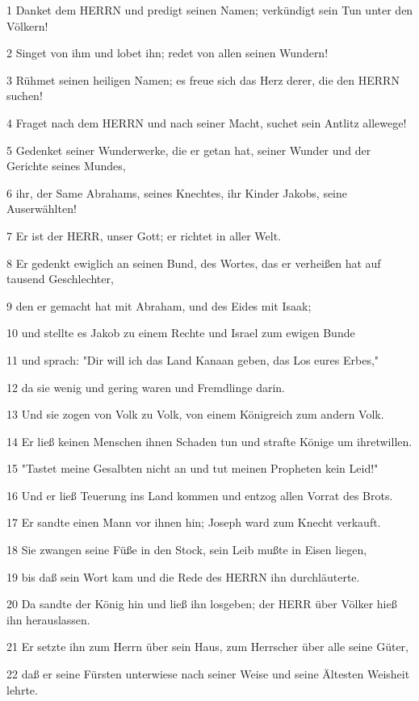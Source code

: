 \par 1 Danket dem HERRN und predigt seinen Namen; verkündigt sein Tun unter den Völkern!
\par 2 Singet von ihm und lobet ihn; redet von allen seinen Wundern!
\par 3 Rühmet seinen heiligen Namen; es freue sich das Herz derer, die den HERRN suchen!
\par 4 Fraget nach dem HERRN und nach seiner Macht, suchet sein Antlitz allewege!
\par 5 Gedenket seiner Wunderwerke, die er getan hat, seiner Wunder und der Gerichte seines Mundes,
\par 6 ihr, der Same Abrahams, seines Knechtes, ihr Kinder Jakobs, seine Auserwählten!
\par 7 Er ist der HERR, unser Gott; er richtet in aller Welt.
\par 8 Er gedenkt ewiglich an seinen Bund, des Wortes, das er verheißen hat auf tausend Geschlechter,
\par 9 den er gemacht hat mit Abraham, und des Eides mit Isaak;
\par 10 und stellte es Jakob zu einem Rechte und Israel zum ewigen Bunde
\par 11 und sprach: "Dir will ich das Land Kanaan geben, das Los eures Erbes,"
\par 12 da sie wenig und gering waren und Fremdlinge darin.
\par 13 Und sie zogen von Volk zu Volk, von einem Königreich zum andern Volk.
\par 14 Er ließ keinen Menschen ihnen Schaden tun und strafte Könige um ihretwillen.
\par 15 "Tastet meine Gesalbten nicht an und tut meinen Propheten kein Leid!"
\par 16 Und er ließ Teuerung ins Land kommen und entzog allen Vorrat des Brots.
\par 17 Er sandte einen Mann vor ihnen hin; Joseph ward zum Knecht verkauft.
\par 18 Sie zwangen seine Füße in den Stock, sein Leib mußte in Eisen liegen,
\par 19 bis daß sein Wort kam und die Rede des HERRN ihn durchläuterte.
\par 20 Da sandte der König hin und ließ ihn losgeben; der HERR über Völker hieß ihn herauslassen.
\par 21 Er setzte ihn zum Herrn über sein Haus, zum Herrscher über alle seine Güter,
\par 22 daß er seine Fürsten unterwiese nach seiner Weise und seine Ältesten Weisheit lehrte.
